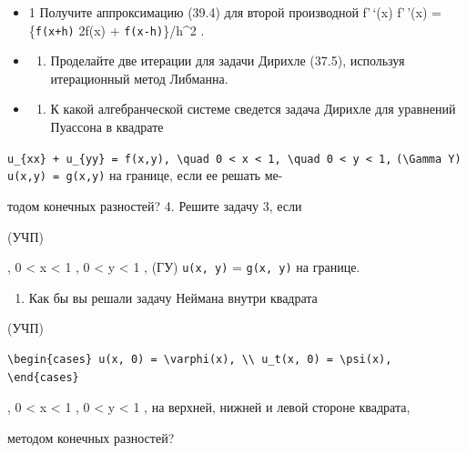 \documentclass[
  ukrainian,
]{article}
\providecommand{\tightlist}{%
  \setlength{\itemsep}{0pt}\setlength{\parskip}{0pt}}
\begin{document}
\begin{itemize}
\item
  1 Получите аппроксимацию (39.4) для второй производной f'\,`(x)
  f'\,'(x) = \{\texttt{f(x+h)} 2f(x) + \texttt{f(x-h)}\}/h\^{}2 .
\item
  \begin{enumerate}
  \def\labelenumi{\arabic{enumi}.}
  \setcounter{enumi}{1}
  \tightlist
  \item
    Проделайте две итерации для задачи Дирихле (37.5), используя
    итерационный метод Либманна.
  \end{enumerate}
\item
  \begin{enumerate}
  \def\labelenumi{\arabic{enumi}.}
  \setcounter{enumi}{2}
  \tightlist
  \item
    К какой алгебранческой системе сведется задача Дирихле для уравнений
    Пуассона в квадрате
  \end{enumerate}
\end{itemize}

\texttt{u\_\{xx\}\ +\ u\_\{yy\}\ =\ f(x,y),\ \textbackslash{}quad\ 0\ \textless{}\ x\ \textless{}\ 1,\ \textbackslash{}quad\ 0\ \textless{}\ y\ \textless{}\ 1,}
\texttt{(\textbackslash{}Gamma\ Y)} \texttt{u(x,y)\ =\ g(x,y)} на
границе, если ее решать ме-

тодом конечных разностей? 4. Решите задачу 3, если

(УЧП)

, 0 \textless{} x \textless{} 1 , 0 \textless{} y \textless{} 1 , (ГУ)
\texttt{u(x,\ y)} = \texttt{g(x,\ y)} на границе.

\begin{enumerate}
\def\labelenumi{\arabic{enumi}.}
\setcounter{enumi}{4}
\tightlist
\item
  Как бы вы решали задачу Неймана внутри квадрата
\end{enumerate}

(УЧП)

\begin{verbatim}
\begin{cases} u(x, 0) = \varphi(x), \\ u_t(x, 0) = \psi(x), \end{cases}
\end{verbatim}

, 0 \textless{} x \textless{} 1 , 0 \textless{} y \textless{} 1 , на
верхней, нижней и левой стороне квадрата,

методом конечных разностей?
\end{document}
